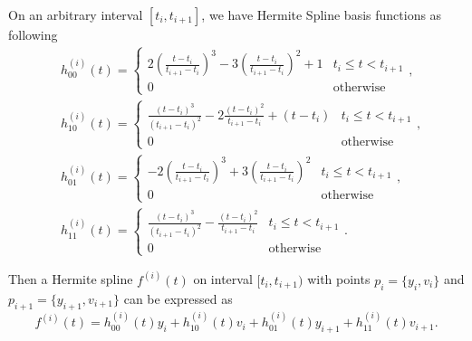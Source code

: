 On an arbitrary interval $[t_i,t_{i+1}]$, we have Hermite Spline basis functions as following
\begin{align}\label{hermitebasis1}
&h_{00}^{(i)}(t)=
\begin{cases}
2(\frac{t-t_{i}}{t_{i+1}-t_{i}})^3-3(\frac{t-t_{i}}{t_{i+1}-t_{i}})^2+1 & t_i\leq t<t_{i+1} \\ 
0 & \mbox{otherwise}
\end{cases}, \\
&h_{10}^{(i)}(t)=\begin{cases}
\frac{(t-t_{i})^3}{(t_{i+1}-t_{i})^2}-2\frac{(t-t_{i})^2}{t_{i+1}-t_{i}}+(t-t_{i}) & t_i\leq t<t_{i+1} \\ 
0 &   \mbox{otherwise}
\end{cases},\\
&h_{01}^{(i)}(t)=
\begin{cases}
-2(\frac{t-t_i}{t_{i+1}-t_i})^3+3(\frac{t-t_i}{t_{i+1}-t_i})^2 & t_i\leq t<t_{i+1} \\ 
0 &   \mbox{otherwise}
\end{cases},\\
&h_{11}^{(i)}(t)=\begin{cases}
\frac{(t-t_i)^3}{(t_{i+1}-t_i)^2}-\frac{(t-t_i)^2}{t_{i+1}-t_i} & t_i\leq t<t_{i+1} \\ 
0 &   \mbox{otherwise}
\end{cases}.
\end{align}

Then a Hermite spline $f^{(i)}(t)$ on interval $[t_i,t_{i+1})$ with points $p_i=\{y_i,v_i\}$ and $p_{i+1}=\{y_{i+1},v_{i+1} \}$  can be expressed as
\begin{equation}
f^{(i)}(t)=h_{00}^{(i)}(t)y_i+h_{10}^{(i)}(t)v_i+h_{01}^{(i)}(t)y_{i+1}+h_{11}^{(i)}(t)v_{i+1}.
\end{equation}

